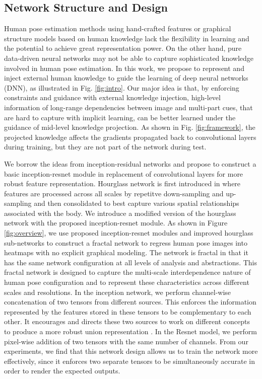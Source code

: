 \documentclass[journal ]{IEEEtran}
\begin{document}
\subsection{Network Structure and Design}
\label{sec:fractal-network}

Human pose estimation methods using hand-crafted features or graphical structure models based on human knowledge lack the flexibility in learning and the potential to achieve great representation power. On the other hand, pure data-driven neural networks may not be able to capture sophisticated knowledge involved in human pose estimation.
In this work, we propose to represent and inject external human knowledge to guide the learning of deep neural networks (DNN), as illustrated in Fig. \ref{fig:intro}. 
Our major idea is that, by enforcing constraints and guidance with external knowledge injection, high-level information of long-range dependencies between image and multi-part cues, that are hard to capture with implicit learning, can be better learned under the guidance of mid-level knowledge projection.
As shown in Fig. \ref{fig:framework}, the projected knowledge affects the gradients propagated back to convolutional layers during training, but they are not part of the network during test.

We borrow the ideas from inception-residual networks \cite{szegedy2016inception} and propose to construct a basic inception-resnet module in replacement of convolutional layers for more robust feature representation. 
Hourglass network is first introduced in \cite{newell2016stacked} where features are processed across all scales by repetitve down-sampling and up-sampling and then consolidated to best capture various spatial relationships associated with the body. We introduce a modified version of the hourglass network with the proposed inception-resnet module. 
As shown in Figure \ref{fig:overview}, we use proposed inception-resnet modules and improved hourglass sub-networks to construct a fractal network to regress human pose images into heatmaps with no explicit graphical modeling. The network is fractal in that it has the same network configuration at all levels of analysis and abstractions.
This fractal network is designed to capture the multi-scale interdependence nature of human pose configuration and to represent these characteristics across different scales and resolutions.
In the inception network, we perform channel-wise concatenation of two tensors from different sources. This enforces the information represented by the features stored in these tensors to be complementary to each other. It encourages and directs these two sources to work on different concepts to produce a more robust union representation \cite{he2016deep}. In the 
Resnet model, we perform pixel-wise addition of two tensors with the same number of channels. From our experiments, we find that this network design allows us to train the network more effectively, since it enforces two separate tensors to be simultaneously accurate in order to render the expected outputs.  
\end{document}
